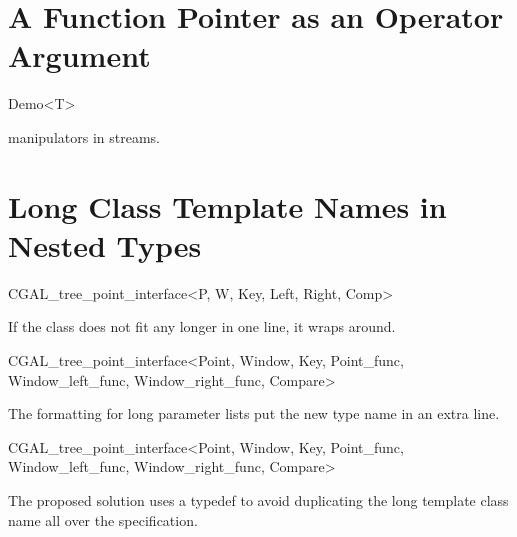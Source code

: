 \documentclass[12pt]{article}
\begin{document}
{{{
\def\ccTagRmTemplate{\ccFalse}

\section{A Function Pointer as an Operator Argument}

\begin{ccClassTemplate}{Demo<T>}
\ccThreeToTwo

{manipulators in streams.}

\end{ccClassTemplate}

\section{Long Class Template Names in Nested Types}


\begin{ccClassTemplate}{CGAL_tree_point_interface<P, W, Key,  
    Left, Right, Comp>}
\end{ccClassTemplate}

If the class does not fit any longer in one line, it wraps around.

\begin{ccClassTemplate}{CGAL_tree_point_interface<Point, Window, Key,  
         Point_func, Window_left_func, 
         Window_right_func, Compare>}
\end{ccClassTemplate}

The formatting for long parameter lists put the new type name in an extra line.

\begin{ccClassTemplate}{CGAL_tree_point_interface<Point, Window, Key,  
         Point_func, Window_left_func, 
         Window_right_func, Compare>}
\def\ccLongParamLayout{\ccTrue}
\def\ccLongParamLayout{\ccFalse}
\end{ccClassTemplate}

The proposed solution uses a typedef to avoid duplicating the long
template class name all over the specification.

}}}
\end{document}
